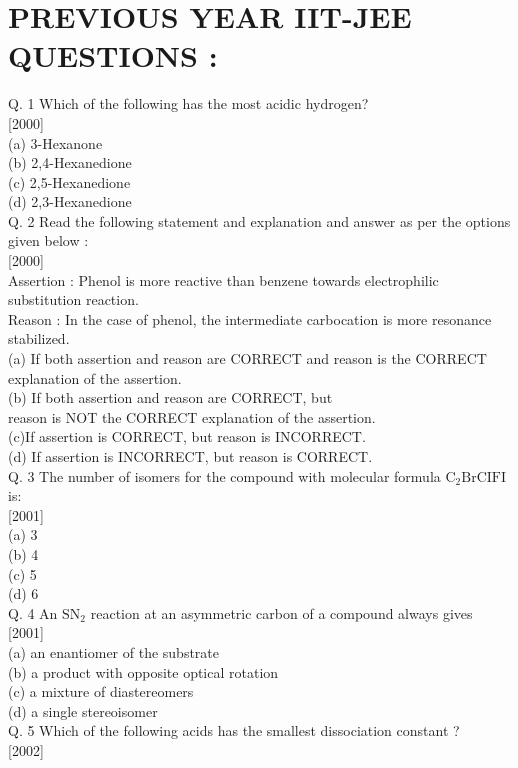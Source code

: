 \documentclass[10pt]{article}
\begin{document}
\section*{PREVIOUS YEAR IIT-JEE QUESTIONS :}
Q. 1 Which of the following has the most acidic hydrogen?\\[0pt]
[2000]\\
(a) 3-Hexanone\\
(b) 2,4-Hexanedione\\
(c) 2,5-Hexanedione\\
(d) 2,3-Hexanedione\\
Q. 2 Read the following statement and explanation and answer as per the options given below :\\[0pt]
[2000]\\
Assertion : Phenol is more reactive than benzene towards electrophilic substitution reaction.\\
Reason : In the case of phenol, the intermediate carbocation is more resonance stabilized.\\
(a) If both assertion and reason are CORRECT and reason is the CORRECT explanation of the assertion.\\
(b) If both assertion and reason are CORRECT, but\\
reason is NOT the CORRECT explanation of the assertion.\\
(c)If assertion is CORRECT, but reason is INCORRECT.\\
(d) If assertion is INCORRECT, but reason is CORRECT.\\
Q. 3 The number of isomers for the compound with molecular formula $\mathrm{C}_{2} \mathrm{BrCIFI}$ is:\\[0pt]
[2001]\\
(a) 3\\
(b) 4\\
(c) 5\\
(d) 6\\
Q. 4 An $\mathrm{SN}_{2}$ reaction at an asymmetric carbon of a compound always gives\\[0pt]
[2001]\\
(a) an enantiomer of the substrate\\
(b) a product with opposite optical rotation\\
(c) a mixture of diastereomers\\
(d) a single stereoisomer\\
Q. 5 Which of the following acids has the smallest dissociation constant ?\\[0pt]
[2002]\\
\end{document}
